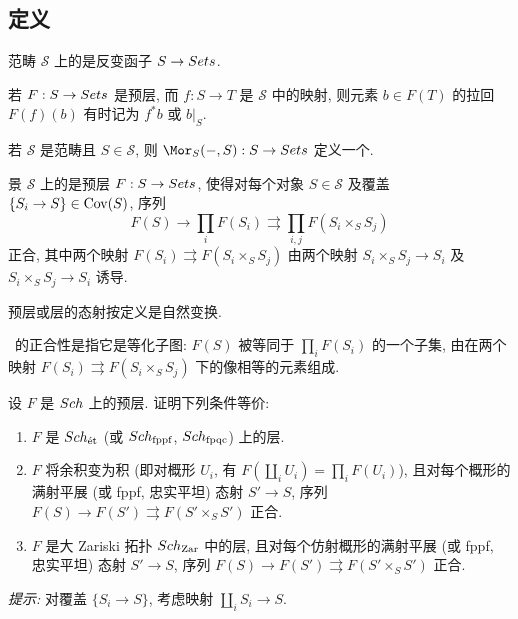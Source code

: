 \subsection{定义}\label{src:3.3.1-subsection}
\begin{definition}[预层]\label{src:3.3.1}
范畴 $\mathcal S$ 上的是反变函子 $S\to Sets$.
\end{definition}
\begin{remark}\label{src:3.3.2}
若 $F:S\to Sets$ 是预层, 而 $f:S\to T$ 是 $\mathcal S$ 中的映射, 则元素 $b\in F(T)$ 的拉回 $F(f)(b)$ 有时记为 $f^*b$ 或 $b|_S$.
\end{remark}
\begin{example}[可表预层]\label{src:3.3.3}
若 $\mathcal S$ 是范畴且 $S\in\mathcal S$, 则 $\Mor_{\mathcal S}(-,S):\mathcal S\to\Sets$ 定义一个.
\end{example}
\begin{definition}[层]\label{src:3.3.4}
景 $\mathcal S$ 上的是预层 $F:S\to Sets$, 使得对每个对象 $S\in\mathcal S$ 及覆盖 $\{S_i\to S\}\in\operatorname{Cov}(S)$, 序列
\begin{equation}\label{src:3.3.5}
F(S)\longrightarrow\prod_i F(S_i)\rightrightarrows\prod_{i,j}F(S_i\times_S S_j)
\end{equation}
正合, 其中两个映射 $F(S_i)\rightrightarrows F(S_i\times_S S_j)$ 由两个映射 $S_i\times_S S_j\to S_i$ 及 $S_i\times_S S_j\to S_i$ 诱导.
\end{definition}
预层或层的态射按定义是自然变换.
\begin{remark}\label{src:3.3.6}
~的正合性是指它是等化子图: $F(S)$ 被等同于 $\prod_i F(S_i)$ 的一个子集, 由在两个映射 $F(S_i)\rightrightarrows F(S_i\times_S S_j)$ 下的像相等的元素组成.
\end{remark}
\begin{exercise}\label{src:3.3.7}
设 $F$ 是 $Sch$ 上的预层. 证明下列条件等价:
\begin{enumerate}[(1)]
\item $F$ 是 $Sch_{\text{ét}}$ (或 $Sch_{\mathrm{fppf}}$, $Sch_{\mathrm{fpqc}}$) 上的层.
\item $F$ 将余积变为积 (即对概形 $U_i$, 有 $F(\coprod_i U_i)=\prod_i F(U_i)$), 且对每个概形的满射平展 (或 fppf, 忠实平坦) 态射 $S'\to S$, 序列 $F(S)\to F(S')\rightrightarrows F(S'\times_S S')$ 正合.
\item $F$ 是大 Zariski 拓扑 $Sch_{\mathrm{Zar}}$ 中的层, 且对每个仿射概形的满射平展 (或 fppf, 忠实平坦) 态射 $S'\to S$, 序列 $F(S)\to F(S')\rightrightarrows F(S'\times_S S')$ 正合.
\end{enumerate}
\textit{提示:} 对覆盖 $\{S_i\to S\}$, 考虑映射 $\coprod_i S_i\to S$.
\end{exercise}
